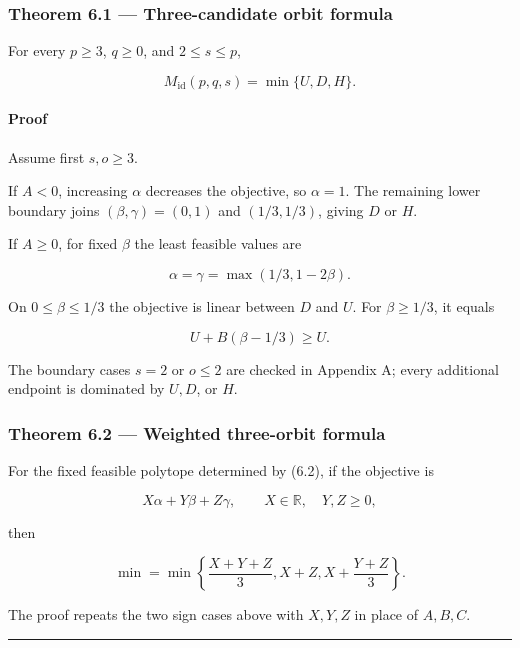 \documentclass[11pt,a4paper]{article}
\begin{document}
\subsubsection{Theorem 6.1 --- Three-candidate orbit formula}\label{theorem-6.1-three-candidate-orbit-formula}

For every \(p\ge3\), \(q\ge0\), and \(2\le s\le p\),

\[
\boxed{
M_{\mathrm{id}}(p,q,s)=\min\{U,D,H\}.
}
\tag{6.4}
\]

\paragraph{Proof}\label{proof}

Assume first \(s,o\ge3\).

If \(A<0\), increasing \(\alpha\) decreases the objective, so \(\alpha=1\). The remaining lower boundary joins \((\beta,\gamma)=(0,1)\) and \((1/3,1/3)\), giving \(D\) or \(H\).

If \(A\ge0\), for fixed \(\beta\) the least feasible values are

\[
\alpha=\gamma=\max(1/3,1-2\beta).
\]

On \(0\le\beta\le1/3\) the objective is linear between \(D\) and \(U\). For \(\beta\ge1/3\), it equals

\[
U+B(\beta-1/3)\ge U.
\]

The boundary cases \(s=2\) or \(o\le2\) are checked in Appendix A; every additional endpoint is dominated by \(U,D\), or \(H\).

\subsubsection{Theorem 6.2 --- Weighted three-orbit formula}\label{theorem-6.2-weighted-three-orbit-formula}

For the fixed feasible polytope determined by (6.2), if the objective is

\[
X\alpha+Y\beta+Z\gamma,
\qquad
X\in\mathbb R,\quad Y,Z\ge0,
\]

then

\[
\boxed{
\min
=
\min\left\{
\frac{X+Y+Z}{3},
X+Z,
X+\frac{Y+Z}{3}
\right\}.
}
\tag{6.5}
\]

The proof repeats the two sign cases above with \(X,Y,Z\) in place of \(A,B,C\).

\begin{center}\rule{0.5\linewidth}{0.5pt}\end{center}
\end{document}
